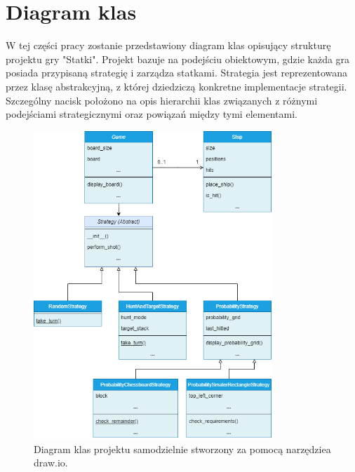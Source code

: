 \documentclass[magisterska]{pracadypl}
\begin{document}
\section{Diagram klas}
W tej części pracy zostanie przedstawiony diagram klas opisujący strukturę projektu gry "Statki". Projekt bazuje na podejściu obiektowym, gdzie każda gra posiada przypisaną strategię i zarządza statkami. Strategia jest reprezentowana przez klasę abstrakcyjną, z której dziedziczą konkretne implementacje strategii. Szczególny nacisk położono na opis hierarchii klas związanych z różnymi podejściami strategicznymi oraz powiązań między tymi elementami.
\begin{figure}[H] 
    \centering %
    \includegraphics[width=0.8\textwidth]{diagram_klas_27_09.png} %
    \caption{Diagram klas projektu samodzielnie stworzony za pomocą narzędziea draw.io.} %
    \label{fig:example} %
\end{figure}
\end{document}
